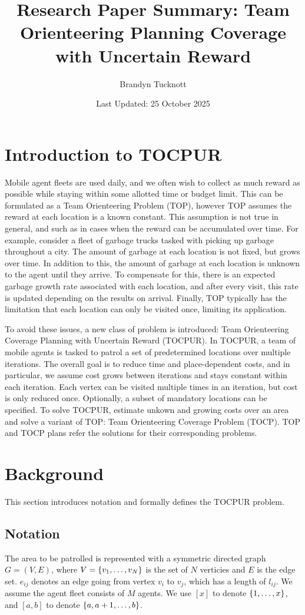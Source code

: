 \documentclass{exam}
\title{Research Paper Summary: Team Orienteering Planning Coverage with Uncertain Reward}
\author{Brandyn Tucknott}
\date{Last Updated: 25 October 2025}
\begin{document}
\maketitle

\section{Introduction to TOCPUR}
Mobile agent fleets are used daily, and we often wish to collect as much reward as possible while staying within some allotted time or budget limit.
This can be formulated as a Team Orienteering Problem (TOP), however TOP assumes the reward at each location is a known constant. This
assumption is not true in general, and such as in cases when the reward can be accumulated over time. For example, consider a fleet
of garbage trucks tasked with picking up garbage throughout a city. The amount of garbage at each location is not fixed, but grows over time. In addition
to this, the amount of garbage at each location is unknown to the agent until they arrive. To compensate for this, there is an expected garbage growth rate
associated with each location, and after every visit, this rate is updated depending on the results on arrival. Finally, TOP typically has the limitation that each
location can only be visited once, limiting its application.

To avoid these issues, a new class of problem is introduced: Team Orienteering Coverage Planning with Uncertain Reward (TOCPUR). In TOCPUR, a team
of mobile agents is tasked to patrol a set of predetermined locations over multiple iterations. The overall goal is to reduce time and place-dependent costs, and in particular, 
we assume cost grows between iterations and stays constant within each iteration. Each vertex can be visited multiple times in an iteration, but cost 
is only reduced once. Optionally, a subset of mandatory locations can be specified. To solve TOCPUR, estimate unkown and growing costs over an area and solve a variant
of TOP: Team Orienteering Coverage Problem (TOCP). TOP and TOCP plans refer the solutions for their corresponding problems.

\section{Background}
This section introduces notation and formally defines the TOCPUR problem.

\subsection{Notation}
The area to be patrolled is represented with a symmetric directed graph $G = (V, E)$, where $V = \left \{ v_1, \hdots, v_N \right \}$ is the set of $N$ verticies
and $E$ is the edge set. $e_{ij}$ denotes an edge going from vertex $v_i$ to $v_j$, which has a length of $l_{ij}$. We assume the agent fleet
consists of $M$ agents. We use $[x]$ to denote $\left \{ 1, \hdots, x \right \}$, and $[a, b]$ to denote $\left \{ a, a + 1, \hdots, b \right \}$.
\end{document}
